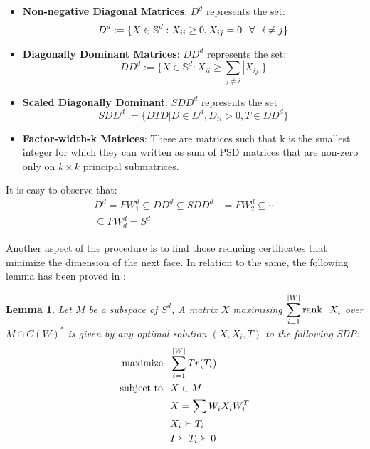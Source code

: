 \documentclass[twoside]{article}
\newtheorem{lemma}[theorem]{Lemma}
\begin{document}
\begin{multicols}{2}
\begin{itemize}
\item \textbf{\color{blue}Non-negative Diagonal Matrices}: $D^d$ represents the set: 
\begin{equation*}
    D^d := \{X \in \mathbb{S}^d : X_{ii} \ge 0, X_{ij} = 0 \hspace{0.1in} \forall \hspace{0.1in} i \neq j \}
\end{equation*}
\item\textbf{\color{blue}Diagonally Dominant Matrices}: $DD^d$ represents the set:
\begin{equation*}
    DD^d := \{X \in \mathbb{S}^d : X_{ii} \ge \sum_{j \neq i} |X_{ij}|\}
\end{equation*}
\item \textbf{\color{blue}Scaled Diagonally Dominant}: $SDD^d$ represents the set :
\begin{equation*}
    SDD^d := \{DTD |D \in D^d, D_{ii} > 0, T \in DD^d \}
\end{equation*}
\item \textbf{\color{blue}Factor-width-k Matrices}: These are matrices such that k is the smallest integer for which they can written as sum of PSD matrices that are non-zero only on $k \times k$ principal submatrices.
\end{itemize}
It is easy to observe that:
\begin{align*}
    D^d = FW_1^d \subseteq DD^d \subseteq SDD^d &= FW_2^d \subseteq \cdots \\ \subseteq FW_d^d = S_+^d
\end{align*}

Another aspect of the procedure is to find those reducing certificates that minimize the dimension of the next face. In relation to the same, the following lemma has been proved in \cite{permenter2014partial}: 
\begin{lemma}
Let $M$ be a subspace of $S^d$, A matrix $X$ maximising $\displaystyle\sum_{i=1}^{|W|} \mbox{rank} \hspace{0.1in} X_i$ over $M \cap C(W)^*$ is given by any optimal solution $(X,X_i,T)$ to the following SDP:
\begin{align*}
        \mbox{maximize} \hspace{0.1in} & \sum_{i=1}^{|W|} Tr(T_i)\\
        \mbox{subject to} \hspace{0.1in} & X \in M \\
        \hspace{0.1in} & X = \sum W_iX_iW_i^T \\
        \hspace{0.1in} & X_i \succeq T_i  \\
        \hspace{0.1in} & I \succeq T_i \succeq 0
\end{align*}
\end{lemma}


\end{multicols}
\end{document}
